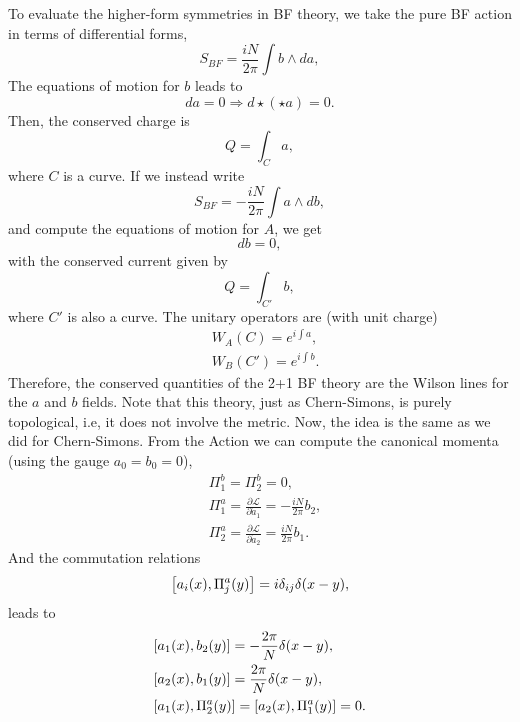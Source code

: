 \documentclass{article}
\begin{document}
To evaluate the higher-form symmetries in BF theory, we take the pure BF action in terms of differential forms,
\begin{equation}
	S_{BF}=\frac{iN}{2\pi}\int b\wedge da,
\end{equation}
The equations of motion for $b$ leads to 
\begin{equation}
	da=0\Rightarrow d\star(\star a)=0.
\end{equation}
Then, the conserved charge is 
\begin{equation}
	Q=\int_C a,
\end{equation}
where $C$ is a curve. If we instead write 
\begin{equation}
	S_{BF}=-\frac{iN}{2\pi}\int a\wedge db,
\end{equation}
and compute the equations of motion for $A$, we get 
\begin{equation}
	db=0,
\end{equation}
with the conserved current given by 
\begin{equation}
	Q=\int_{C'}b,
\end{equation}
where $C'$ is also a curve. The unitary operators are (with unit charge) 
\begin{align}
	&W_A(C)=e^{i\int a},\\
	&W_B(C')=e^{i\int b}.
\end{align}
Therefore, the conserved quantities of the 2+1 BF theory are the Wilson lines for the $a$ and $b$ fields. Note that this theory, just as Chern-Simons, is purely topological, i.e, it does not involve the metric. Now, the idea is the same as we did for Chern-Simons. From the Action we can compute the canonical momenta (using the gauge $a_0=b_0=0$),
\begin{equation}
	\begin{split}
		&\Pi_1^b=\Pi_2^b=0,\\
		&\Pi_1^a=\frac{\partial \mathcal{L}}{\partial \dot{a}_1}=-\frac{iN}{2\pi}b_2,\\
		&\Pi_2^a=\frac{\partial \mathcal{L}}{\partial \dot{
				a}_2}=\frac{iN}{2\pi}b_1.
	\end{split}
\end{equation}
And the commutation relations 
\begin{equation}
	\comm{a_i(x)}{\Pi_j^a(y)}=i\delta_{ij}\delta(x-y),
\end{equation}
leads to 
\begin{align}
	&\comm{a_1(x)}{b_2(y)}=-\frac{2\pi}{N}\delta(x-y),\label{comm a1b2}\\
	&\comm{a_2(x)}{b_1(y)}=\frac{2\pi}{N}\delta(x-y),\label{comm a2b1}\\
	&\comm{a_1(x)}{\Pi_2^a(y)}=\comm{a_2(x)}{\Pi_1^a(y)}=0.
\end{align}
\end{document}
